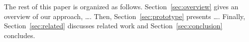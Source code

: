 


The rest of this paper is organized as follows.
Section~\ref{sec:overview} gives an overview of our approach, \ldots.
Then, Section~\ref{sec:prototype} presents \ldots. Finally,
Section~\ref{sec:related} discusses related work and
Section~\ref{sec:conclusion} concludes.



